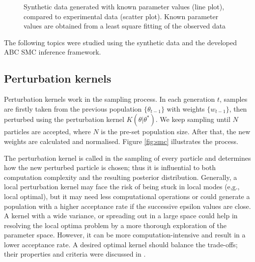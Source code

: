\begin{figure}[ht]
    \begin{center}
    \end{center}

    \caption[Synthetic data generated with known parameter values]%
    {Synthetic data generated with known parameter values (line plot), compared to experimental data (scatter plot). Known parameter values are obtained from a least square fitting of the observed data}
    \label{fig:infer_back_data}

\end{figure}


The following topics were studied using the synthetic data and the developed ABC SMC inference framework.

\subsection{Perturbation kernels}

Perturbation kernels work in the sampling process. In each generation $t$, samples are firstly taken from the previous population $\{\theta_{t-1}\}$ with weights $\{w_{t-1}\}$, then perturbed using the perturbation kernel $K(\theta|\theta^*)$. We keep sampling until $N$ particles are accepted, where $N$ is the pre-set population size. After that, the new weights are calculated and normalised. Figure \ref{fig:smc} illustrates the process.

The perturbation kernel is called in the sampling of every particle and determines how the new perturbed particle is chosen; thus it is influential to both computation complexity and the resulting posterior distribution. Generally, a local perturbation kernel may face the risk of being stuck in local modes (e,g., local optimal), but it may need less computational operations or could generate a population with a higher acceptance rate if the successive epsilon values are close. A kernel with a wide variance, or spreading out in a large space could help in resolving the local optima problem by a more thorough exploration of the parameter space. However, it can be more computation-intensive and result in a lower acceptance rate. A desired optimal kernel should balance the trade-offs; their properties and criteria were discussed in \cite{ref:kernel}.

